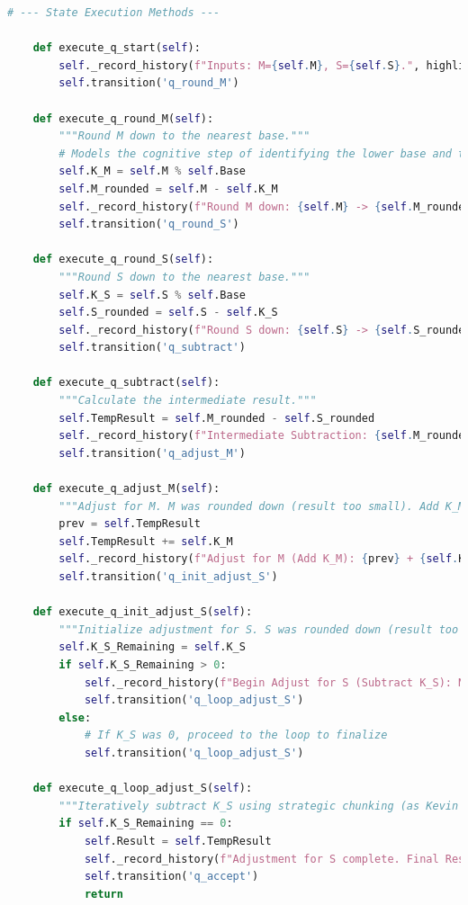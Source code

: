 \documentclass[11pt]{article}
\begin{document}
\begin{lstlisting}[language=Python]
    # --- State Execution Methods ---

    def execute_q_start(self):
        self._record_history(f"Inputs: M={self.M}, S={self.S}.", highlight=True)
        self.transition('q_round_M')

    def execute_q_round_M(self):
        """Round M down to the nearest base."""
        # Models the cognitive step of identifying the lower base and the difference.
        self.K_M = self.M % self.Base
        self.M_rounded = self.M - self.K_M
        self._record_history(f"Round M down: {self.M} -> {self.M_rounded}. (K_M = {self.K_M}).")
        self.transition('q_round_S')

    def execute_q_round_S(self):
        """Round S down to the nearest base."""
        self.K_S = self.S % self.Base
        self.S_rounded = self.S - self.K_S
        self._record_history(f"Round S down: {self.S} -> {self.S_rounded}. (K_S = {self.K_S}).")
        self.transition('q_subtract')

    def execute_q_subtract(self):
        """Calculate the intermediate result."""
        self.TempResult = self.M_rounded - self.S_rounded
        self._record_history(f"Intermediate Subtraction: {self.M_rounded} - {self.S_rounded} = {self.TempResult}.", highlight=True)
        self.transition('q_adjust_M')

    def execute_q_adjust_M(self):
        """Adjust for M. M was rounded down (result too small). Add K_M back."""
        prev = self.TempResult
        self.TempResult += self.K_M
        self._record_history(f"Adjust for M (Add K_M): {prev} + {self.K_M} = {self.TempResult}.", highlight=True)
        self.transition('q_init_adjust_S')

    def execute_q_init_adjust_S(self):
        """Initialize adjustment for S. S was rounded down (result too big). Subtract K_S."""
        self.K_S_Remaining = self.K_S
        if self.K_S_Remaining > 0:
            self._record_history(f"Begin Adjust for S (Subtract K_S): Need to subtract {self.K_S_Remaining}.")
            self.transition('q_loop_adjust_S')
        else:
            # If K_S was 0, proceed to the loop to finalize
            self.transition('q_loop_adjust_S')

    def execute_q_loop_adjust_S(self):
        """Iteratively subtract K_S using strategic chunking (as Kevin did)."""
        if self.K_S_Remaining == 0:
            self.Result = self.TempResult
            self._record_history(f"Adjustment for S complete. Final Result = {self.Result}.", highlight=True)
            self.transition('q_accept')
            return


\end{lstlisting}
\end{document}
